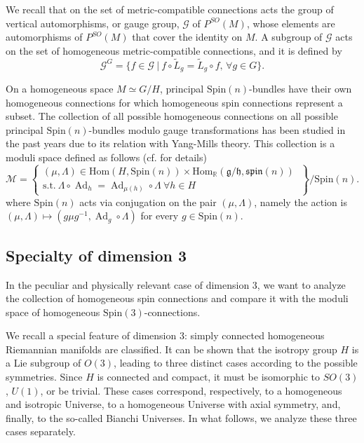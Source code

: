 \documentclass{article}
\numberwithin{equation}{section}
\theoremstyle{definition}
\newcommand{\R}{\mathbb{R}}
\newcommand{\OF}[1]{P^{SO}(#1)}
\newcommand{\Ad}{\operatorname{Ad}}
\begin{document}
We recall that on the set of metric-compatible connections acts the group of vertical automorphisms, or gauge group, $\mathcal{G}$ of $\OF{M}$, whose elements are automorphisms of $\OF{M}$ that cover the identity on $M$.  A subgroup of $\mathcal{G}$ acts on the set of homogeneous metric-compatible connections, and it is defined by
\begin{equation}
\label{gau-inv}
    \mathcal{G}^G=\{f\in\mathcal{G}\ |\ f\circ \tilde{L}_g=\tilde{L}_g\circ f,\,\forall g\in G\}.
\end{equation}


On a homogeneous space $M\simeq G/H$, principal $\mathrm{Spin}(n)$-bundles have their own homogeneous connections for which homogeneous spin connections represent a subset. The collection of all possible homogeneous connections on all possible principal $\mathrm{Spin}(n)$-bundles modulo gauge transformations has been studied in the past years due to its relation with Yang-Mills theory. This collection is a moduli space defined as follows (cf. \cite{Biswas_Teleman_2014} for details)
\begin{equation}
    \mathcal{M}=\left\{\begin{matrix}(\mu,\Lambda)\in \mathrm{Hom}(H,\mathrm{Spin}(n))\times \mathrm{Hom}_{\R}(\mathfrak{g}/\mathfrak{h},\mathfrak{spin}(n))\ \\ \mbox{s.t.}\ \Lambda\circ \Ad_h=\Ad_{\mu(h)}\circ \Lambda\ \forall h\in H \end{matrix}\right\}/\mathrm{Spin}(n).
\end{equation}
where $\mathrm{Spin}(n)$ acts via conjugation on the pair $(\mu,\Lambda)$, namely the action is $(\mu,\Lambda)\mapsto(g\mu g^{-1},\Ad_g\circ\Lambda)$ for every $g\in\mathrm{Spin}(n)$.

\subsection{Specialty of dimension 3}
In the peculiar and physically relevant case of dimension 3, we want to analyze the collection of homogeneous spin connections and compare it with the moduli space of homogeneous $\mathrm{Spin}(3)$-connections.

\medskip

We recall a special feature of dimension $3$: simply connected homogeneous Riemannian manifolds are classified. It can be shown that the isotropy group $H$ is a Lie subgroup of $O(3)$, leading to three distinct cases according to the possible symmetries. Since $H$ is connected and compact, it must be isomorphic to $SO(3)$, $U(1)$, or be trivial. These cases correspond, respectively, to a homogeneous and isotropic Universe, to a homogeneous Universe with axial symmetry, and, finally, to the so-called Bianchi Universes. In what follows, we analyze these three cases separately.
\end{document}

